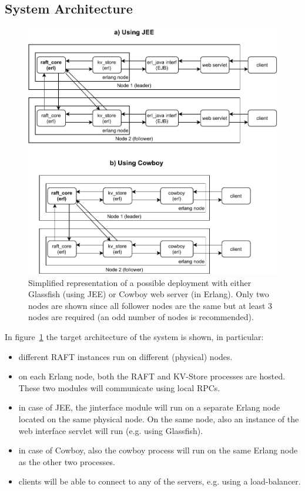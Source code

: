\documentclass[a4paper]{article}
\begin{document}
\subsection{System Architecture}
\begin{figure}
    \includegraphics[width=\textwidth]{raft_arch2.pdf}
    \caption{Simplified representation of a possible deployment with either Glassfish (using JEE) or Cowboy web server (in Erlang). Only two nodes are shown since all follower nodes are the same but at least 3 nodes are required (an odd number of nodes is recommended).}
    \label{fig:raft-arch2}
\end{figure}

In figure~\ref{fig:raft-arch2} the target architecture of the system is shown, 
in particular:
\begin{itemize}
    \item different RAFT instances run on different (physical) nodes.
    \item on each Erlang node, both the RAFT and KV-Store processes are hosted.
        These two modules will communicate using local RPCs.
    \item in case of JEE, the jinterface module will run on a separate Erlang 
        node located on the same physical node. On the same node, also an 
        instance of the web interface servlet will run (e.g. using Glassfish).
    \item in case of Cowboy, also the cowboy process will run on the same 
        Erlang node as the other two processes.
    \item clients will be able to connect to any of the servers, e.g. using 
        a load-balancer.
\end{itemize}
\end{document}
